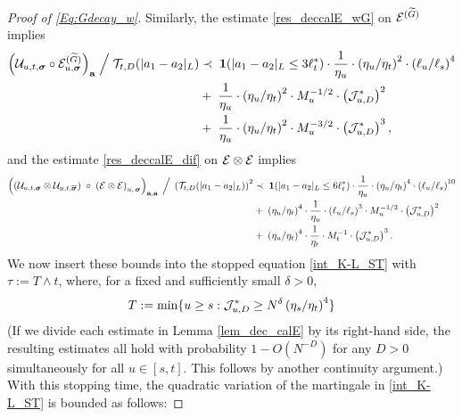 \begin{proof}[Proof of \eqref{Eq:Gdecay_w}]
Similarly,   the estimate \eqref{res_deccalE_wG} on ${\cal E}^{(\widetilde{G} )}$ implies   
\begin{align}  \label{res_deccalE_2}
     \Big(\mathcal{U}_{u,t, \boldsymbol{\sigma}} \circ  \mathcal{E}^{( \widetilde{G} )}_{u, \boldsymbol{\sigma}}\Big)_{\mathbf{a}} 
    \;\Big/\; 
{\cal T}_{t, D}(|a_1-a_2|_{L})
 &\prec \;  {\bf1}(|a_1-a_2|_{L}\le 3\ell_t^*)\cdot  \frac{1} {\eta_u} \cdot \left(\eta_u / \eta_t\right)^2\cdot \left(\ell_u / \ell_s\right)^4 
 \nonumber \\
  &+\;    \frac{1}{\eta_u} 
  \cdot\left(\eta_u / \eta_t\right)^2 \cdot
      M_{u}^{-1/2}  \cdot \left({\cal J}^{*}_{u,D} \right)^{2 }
 \nonumber \\
  &+\;    \frac{1}{\eta_u} 
  \cdot\left(\eta_u / \eta_t\right)^2 \cdot M_{u}^{-3/2}  \cdot \left({\cal J}^{*}_{u,D} \right)^{3 }, 
       \end{align} 
and  the  estimate  \eqref{res_deccalE_dif} on $\cal E\otimes\cal E$  implies  
\begin{align} \label{res_deccalE_3}
  \left(\left(
   \mathcal{U}_{u, t,  \boldsymbol{\sigma}}
   \otimes 
   \mathcal{U}_{u, t,  \overline{\boldsymbol{\sigma}}}
   \right) \;\circ  \;
   \left( \mathcal{E} \otimes  \mathcal{E} \right)
   _{u, \,\boldsymbol{\sigma}  }
   \right)_{{\textbf a}, {\textbf a}}
     \;\Big/\; 
 \left({\cal T}_{t, D}(|a_1-a_2|_{L})\right)^2
 &\prec \;  {\bf1}(|a_1-a_2|_{L}\le 6\ell_t^*)\cdot  \frac{1} {\eta_u} \cdot \left(\eta_u / \eta_t\right)^4\cdot \left(\ell_u / \ell_s\right)^{10} 
 \nonumber \\
 &+ \;  \left(\eta_u / \eta_t\right)^4\cdot\frac{1}{\eta_u} 
  \cdot\left(\ell_u / \ell_s\right)^{3}\cdot
       M_{u}^{-1/2}  \cdot \left({\cal J}^{*}_{u,D} \right)^{2 }
 \nonumber \\
 &+ \;\left(\eta_u / \eta_t\right)^4\cdot\frac{1}{\eta_t} 
  \cdot
       M_{t}^{-1}  \cdot \left({\cal J}^{*}_{u,D} \right)^{3 }.
\end{align}
We now insert  these bounds  into the stopped equation \eqref{int_K-L_ST} with $\tau:=T\wedge t$, where, for a fixed and sufficiently small $\delta>0$,
\begin{align}
T:=\min \{u\geq s: {\cal J}^*_{u,D} \ge N^{\delta}\left(\eta_s / \eta_t\right)^4\}
\end{align}
(If we divide each estimate in Lemma \ref{lem_dec_calE} by its right-hand side, the resulting estimates all hold with probability $1-O(N^{-D})$ for any $D>0$ simultaneously for all $u\in[s,t]$. This follows by another continuity argument.) With this stopping time, the quadratic variation of the martingale in \eqref{int_K-L_ST} is bounded as follows:

\end{proof}
